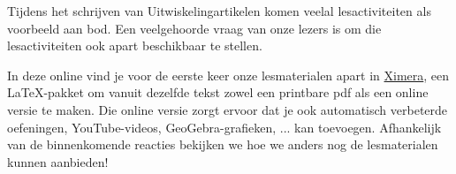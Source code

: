 \documentclass{ximera}
\begin{document}
\author{Alexander Holvoet}

Tijdens het schrijven van Uitwiskelingartikelen komen veelal lesactiviteiten als voorbeeld aan bod.
Een veelgehoorde vraag van onze lezers is om die lesactiviteiten ook apart beschikbaar te stellen.

In deze online vind je voor de eerste keer onze lesmaterialen apart in \href{https://ximera.osu.edu/}{Ximera}, een \LaTeX{}-pakket om vanuit dezelfde tekst zowel een printbare pdf als een online versie te maken.
Die online versie zorgt ervoor dat je ook automatisch verbeterde oefeningen, YouTube-videos, GeoGebra-grafieken, ... kan toevoegen.
Afhankelijk van de binnenkomende reacties bekijken we hoe we anders nog de lesmaterialen kunnen aanbieden!
\end{document}
